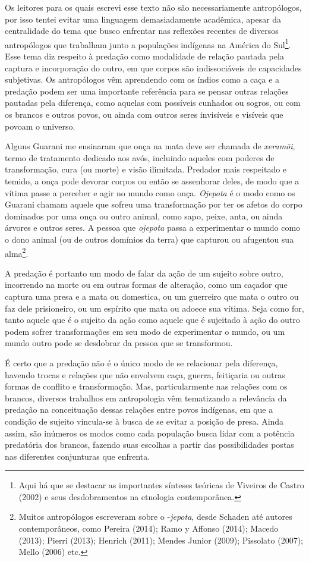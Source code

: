 Os leitores para os quais escrevi esse texto não são necessariamente
antropólogos, por isso tentei evitar uma linguagem demasiadamente
acadêmica, apesar da centralidade do tema que busco enfrentar nas
reflexões recentes de diversos antropólogos que trabalham junto a
populações indígenas na América do Sul\footnote{Aqui há que se destacar
  as importantes sínteses teóricas de Viveiros de Castro (2002) e seus
  desdobramentos na etnologia contemporânea.}. Esse tema diz respeito à
predação como modalidade de relação pautada pela captura e incorporação
do outro, em que corpos são indissociáveis de capacidades subjetivas. Os
antropólogos vêm aprendendo com os índios como a caça e a predação podem
ser uma importante referência para se pensar outras relações pautadas
pela diferença, como aquelas com possíveis cunhados ou sogros, ou com os
brancos e outros povos, ou ainda com outros seres invisíveis e visíveis
que povoam o universo.

Alguns Guarani me ensinaram que onça na mata deve ser chamada de
\emph{xeramõi}, termo de tratamento dedicado aos avós, incluindo aqueles
com poderes de transformação, cura (ou morte) e visão ilimitada.
Predador mais respeitado e temido, a onça pode devorar corpos ou então
se assenhorar deles, de modo que a vítima passe a perceber e agir no
mundo como onça. \emph{Ojepota} é o modo como os Guarani chamam aquele
que sofreu uma transformação por ter os afetos do corpo dominados por
uma onça ou outro animal, como sapo, peixe, anta, ou ainda árvores e
outros seres. A pessoa que \emph{ojepota} passa a experimentar o mundo
como o dono animal (ou de outros domínios da terra) que capturou ou
afugentou sua alma\footnote{Muitos antropólogos escreveram sobre o
  -\emph{jepota}, desde Schaden até autores contemporâneos, como Pereira
  (2014); Ramo y Affonso (2014); Macedo (2013); Pierri (2013); Henrich
  (2011); Mendes Junior (2009); Pissolato (2007); Mello (2006) etc.}.

A predação é portanto um modo de falar da ação de um sujeito sobre
outro, incorrendo na morte ou em outras formas de alteração, como um
caçador que captura uma presa e a mata ou domestica, ou um guerreiro que
mata o outro ou faz dele prisioneiro, ou um espírito que mata ou adoece
sua vítima. Seja como for, tanto aquele que é o sujeito da ação como
aquele que é sujeitado à ação do outro podem sofrer transformações em
seu modo de experimentar o mundo, ou um mundo outro pode se desdobrar da
pessoa que se transformou.

É certo que a predação não é o único modo de se relacionar pela
diferença, havendo trocas e relações que não envolvem caça, guerra,
feitiçaria ou outras formas de conflito e transformação. Mas,
particularmente nas relações com os brancos, diversos trabalhos em
antropologia vêm tematizando a relevância da predação na conceituação
dessas relações entre povos indígenas, em que a condição de sujeito
vincula-se à busca de se evitar a posição de presa. Ainda assim, são
inúmeros os modos como cada população busca lidar com a potência
predatória dos brancos, fazendo suas escolhas a partir das
possibilidades postas nas diferentes conjunturas que enfrenta.

